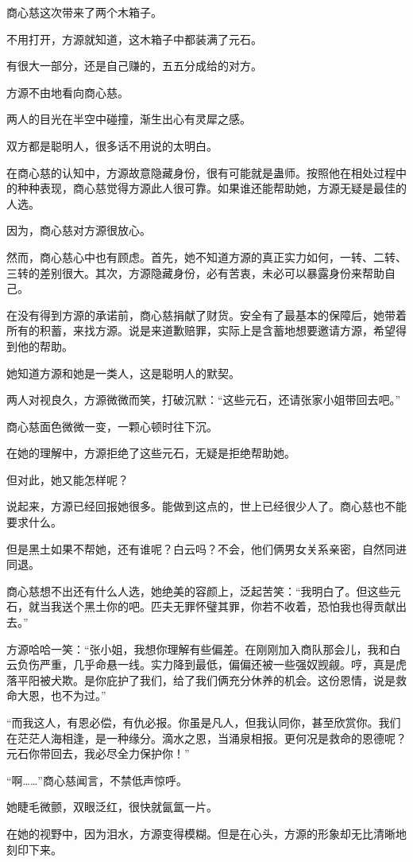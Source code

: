 \begin{this_body}
商心慈这次带来了两个木箱子。

不用打开，方源就知道，这木箱子中都装满了元石。

有很大一部分，还是自己赚的，五五分成给的对方。

方源不由地看向商心慈。

两人的目光在半空中碰撞，渐生出心有灵犀之感。

双方都是聪明人，很多话不用说的太明白。

在商心慈的认知中，方源故意隐藏身份，很有可能就是蛊师。按照他在相处过程中的种种表现，商心慈觉得方源此人很可靠。如果谁还能帮助她，方源无疑是最佳的人选。

因为，商心慈对方源很放心。

然而，商心慈心中也有顾虑。首先，她不知道方源的真正实力如何，一转、二转、三转的差别很大。其次，方源隐藏身份，必有苦衷，未必可以暴露身份来帮助自己。

在没有得到方源的承诺前，商心慈捐献了财货。安全有了最基本的保障后，她带着所有的积蓄，来找方源。说是来道歉赔罪，实际上是含蓄地想要邀请方源，希望得到他的帮助。

她知道方源和她是一类人，这是聪明人的默契。

两人对视良久，方源微微而笑，打破沉默：“这些元石，还请张家小姐带回去吧。”

商心慈面色微微一变，一颗心顿时往下沉。

在她的理解中，方源拒绝了这些元石，无疑是拒绝帮助她。

但对此，她又能怎样呢？

说起来，方源已经回报她很多。能做到这点的，世上已经很少人了。商心慈也不能要求什么。

但是黑土如果不帮她，还有谁呢？白云吗？不会，他们俩男女关系亲密，自然同进同退。

商心慈想不出还有什么人选，她绝美的容颜上，泛起苦笑：“我明白了。但这些元石，就当我送个黑土你的吧。匹夫无罪怀璧其罪，你若不收着，恐怕我也得贡献出去。”

方源哈哈一笑：“张小姐，我想你理解有些偏差。在刚刚加入商队那会儿，我和白云负伤严重，几乎命悬一线。实力降到最低，偏偏还被一些强奴觊觎。哼，真是虎落平阳被犬欺。是你庇护了我们，给了我们俩充分休养的机会。这份恩情，说是救命大恩，也不为过。”

“而我这人，有恩必偿，有仇必报。你虽是凡人，但我认同你，甚至欣赏你。我们在茫茫人海相逢，是一种缘分。滴水之恩，当涌泉相报。更何况是救命的恩德呢？元石你带回去，我必尽全力保护你！”

“啊……”商心慈闻言，不禁低声惊呼。

她睫毛微颤，双眼泛红，很快就氤氲一片。

在她的视野中，因为泪水，方源变得模糊。但是在心头，方源的形象却无比清晰地刻印下来。

\end{this_body}

